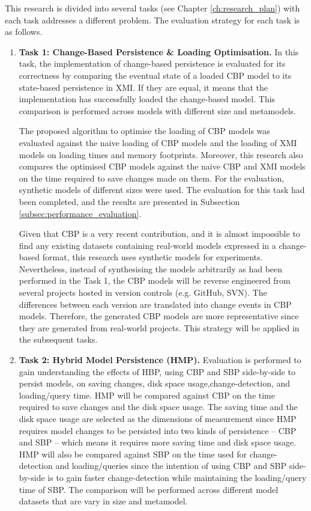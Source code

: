 \documentclass[12pt, a4paper]{report} \usepackage[titletoc]{appendix}
\begin{document}
This research is divided into several tasks (see Chapter \ref{ch:research_plan}) with each task addresses a different problem. The evaluation strategy for each task is as follows. 
\begin{enumerate}
	\item \textbf{Task 1: Change-Based Persistence \& Loading Optimisation.} In this task, the implementation of change-based persistence is evaluated for its correctness by comparing the eventual state of a loaded CBP model to its state-based persistence in XMI. If they are equal, it means that the implementation has successfully loaded the change-based model. This comparison is performed across models with different size and metamodels.    
    
    The proposed algorithm to optimise the loading of CBP models was evaluated against the naive loading of CBP models and the loading of XMI models on loading times and memory footprints. Moreover, this research also compares the optimised CBP models against the naive CBP and XMI models on the time required to save changes made on them. For the evaluation, synthetic models of different sizes were used. The evaluation for this task had been completed, and the results are presented in Subsection \ref{subsec:performance_evaluation}.
	
	Given that CBP is a very recent contribution, and it is almost impossible to find any existing datasets containing real-world models expressed in a change-based format, this research uses synthetic models for experiments. Nevertheless, instead of synthesising the models arbitrarily as had been performed in the Task 1, the CBP models will be reverse engineered from several projects hosted in version controls (e.g. GitHub, SVN). The differences between each version are translated into change events in CBP models. Therefore, the generated CBP models are more representative since they are generated from real-world projects. This strategy will be applied in the subsequent tasks.
	
	\item \textbf{Task 2: Hybrid Model Persistence (HMP).} Evaluation is performed to gain understanding the effects of HBP, using CBP and SBP side-by-side to persist models, on saving changes, disk space usage,change-detection, and loading/query time. HMP will be compared against CBP on the time required to save changes and the disk space usage. The saving time and the disk space usage are selected as the dimensions of measurement since HMP requires model changes to be persisted into two kinds of persistence -- CBP and SBP -- which means it requires more saving time and disk space usage. HMP will also be compared against SBP on the time used for change-detection and loading/queries since the intention of using CBP and SBP side-by-side is to gain faster change-detection while maintaining the loading/query time of SBP. The comparison will be performed across different model datasets that are vary in size and metamodel.
	

\end{enumerate}
\end{document}
